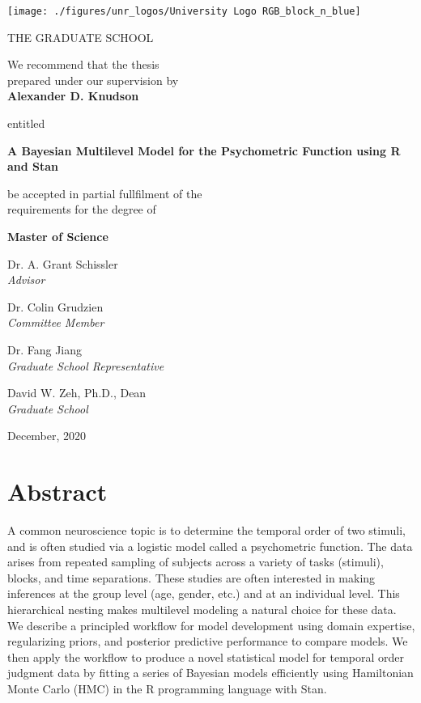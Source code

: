 \documentclass[11pt, oneside, openany]{scrbook}
\begin{document}
\begin{center}

\texttt{[image: ./figures/unr\_logos/University Logo RGB\_block\_n\_blue]}

THE GRADUATE SCHOOL

\vspace{1em}
We recommend that the thesis \\
prepared under our supervision by\\

\vspace{1em}
\textbf{Alexander D. Knudson}

\vspace{1em}
entitled

\textbf{A Bayesian Multilevel Model for the Psychometric Function using R and Stan}

\vspace{2em}
be accepted in partial fullfilment of the \\
requirements for the degree of

\vspace{1em}
\textbf{Master of Science}

\vspace{1em}
Dr. A. Grant Schissler \\
\textit{Advisor}

\vspace{1em}
Dr. Colin Grudzien\\
\textit{Committee Member}

\vspace{1em}
Dr. Fang Jiang \\
\textit{Graduate School Representative}

\vspace{1em}
David W. Zeh, Ph.D., Dean \\
\textit{Graduate School}

\vspace{1em}
December, 2020
\end{center}


\newpage
\setcounter{page}{1} %
\section*{Abstract}

A common neuroscience topic is to determine the temporal order of two stimuli, and is often studied via a logistic model called a psychometric function. The data arises from repeated sampling of subjects across a variety of tasks (stimuli), blocks, and time separations. These studies are often interested in making inferences at the group level (age, gender, etc.) and at an individual level. This hierarchical nesting makes multilevel modeling a natural choice for these data. We describe a principled workflow for model development using domain expertise, regularizing priors, and posterior predictive performance to compare models. We then apply the workflow to produce a novel statistical model for temporal order judgment data by fitting a series of Bayesian models efficiently using Hamiltonian Monte Carlo (HMC) in the R programming language with Stan.
\end{document}
